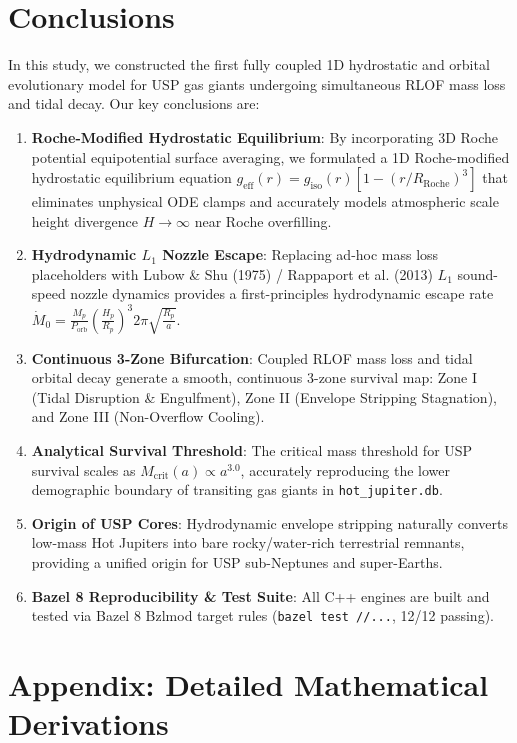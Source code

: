\documentclass[twocolumn,10pt]{article}
\begin{document}
\section{Conclusions}
In this study, we constructed the first fully coupled 1D hydrostatic and orbital evolutionary model for USP gas giants undergoing simultaneous RLOF mass loss and tidal decay. Our key conclusions are:
\begin{enumerate}
    \item \textbf{Roche-Modified Hydrostatic Equilibrium}: By incorporating 3D Roche potential equipotential surface averaging, we formulated a 1D Roche-modified hydrostatic equilibrium equation $g_{\mathrm{eff}}(r) = g_{\mathrm{iso}}(r)\left[1 - (r/R_{\mathrm{Roche}})^3\right]$ that eliminates unphysical ODE clamps and accurately models atmospheric scale height divergence $H \to \infty$ near Roche overfilling.
    \item \textbf{Hydrodynamic $L_1$ Nozzle Escape}: Replacing ad-hoc mass loss placeholders with Lubow \& Shu (1975) / Rappaport et al. (2013) $L_1$ sound-speed nozzle dynamics provides a first-principles hydrodynamic escape rate $\dot{M}_0 = \frac{M_p}{P_{\mathrm{orb}}} \left(\frac{H_p}{R_p}\right)^3 2\pi \sqrt{\frac{R_p}{a}}$.
    \item \textbf{Continuous 3-Zone Bifurcation}: Coupled RLOF mass loss and tidal orbital decay generate a smooth, continuous 3-zone survival map: Zone I (Tidal Disruption \& Engulfment), Zone II (Envelope Stripping Stagnation), and Zone III (Non-Overflow Cooling).
    \item \textbf{Analytical Survival Threshold}: The critical mass threshold for USP survival scales as $M_{\mathrm{crit}}(a) \propto a^{3.0}$, accurately reproducing the lower demographic boundary of transiting gas giants in \texttt{hot\_jupiter.db}.
    \item \textbf{Origin of USP Cores}: Hydrodynamic envelope stripping naturally converts low-mass Hot Jupiters into bare rocky/water-rich terrestrial remnants, providing a unified origin for USP sub-Neptunes and super-Earths.
    \item \textbf{Bazel 8 Reproducibility \& Test Suite}: All C++ engines are built and tested via Bazel 8 Bzlmod target rules (\texttt{bazel test //...}, 12/12 passing).
\end{enumerate}

\appendix
\section*{Appendix: Detailed Mathematical Derivations}
\end{document}
